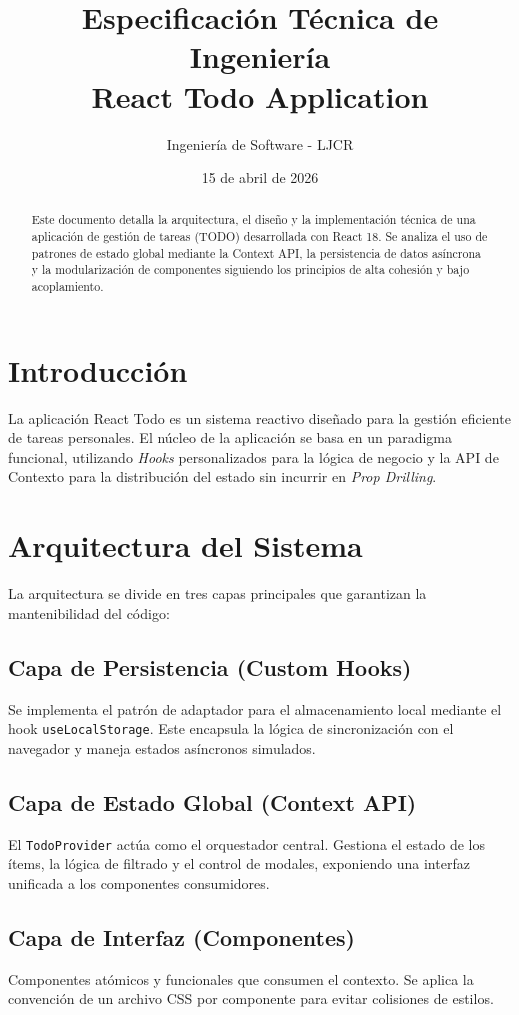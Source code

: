 \documentclass[12pt,a4paper]{article}
\title{Especificación Técnica de Ingeniería\\ \textbf{React Todo Application}}
\author{Ingeniería de Software - LJCR}
\date{15 de abril de 2026}
\begin{document}
\maketitle

\begin{abstract}
Este documento detalla la arquitectura, el diseño y la implementación técnica de una aplicación de gestión de tareas (TODO) desarrollada con React 18. Se analiza el uso de patrones de estado global mediante la Context API, la persistencia de datos asíncrona y la modularización de componentes siguiendo los principios de alta cohesión y bajo acoplamiento.
\end{abstract}

\newpage
\tableofcontents
\newpage

\section{Introducción}
La aplicación React Todo es un sistema reactivo diseñado para la gestión eficiente de tareas personales. El núcleo de la aplicación se basa en un paradigma funcional, utilizando \textit{Hooks} personalizados para la lógica de negocio y la API de Contexto para la distribución del estado sin incurrir en \textit{Prop Drilling}.

\section{Arquitectura del Sistema}
La arquitectura se divide en tres capas principales que garantizan la mantenibilidad del código:

\subsection{Capa de Persistencia (Custom Hooks)}
Se implementa el patrón de adaptador para el almacenamiento local mediante el hook \texttt{useLocalStorage}. Este encapsula la lógica de sincronización con el navegador y maneja estados asíncronos simulados.

\subsection{Capa de Estado Global (Context API)}
El \texttt{TodoProvider} actúa como el orquestador central. Gestiona el estado de los ítems, la lógica de filtrado y el control de modales, exponiendo una interfaz unificada a los componentes consumidores.

\subsection{Capa de Interfaz (Componentes)}
Componentes atómicos y funcionales que consumen el contexto. Se aplica la convención de un archivo CSS por componente para evitar colisiones de estilos.
\end{document}
